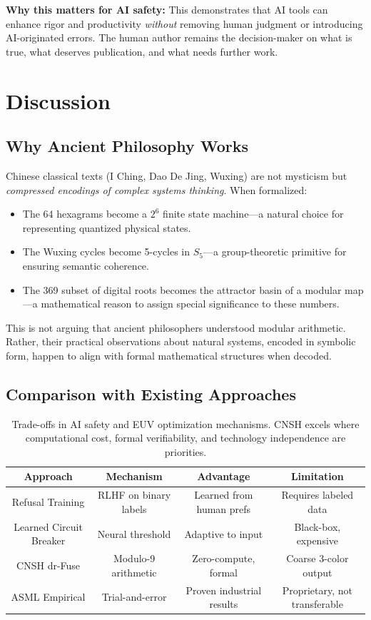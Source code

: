 \documentclass[twocolumn]{article}
\begin{document}
\textbf{Why this matters for AI safety:} This demonstrates that AI tools can enhance rigor and productivity \emph{without} removing human judgment or introducing AI-originated errors. The human author remains the decision-maker on what is true, what deserves publication, and what needs further work.

\section{Discussion}

\subsection{Why Ancient Philosophy Works}

Chinese classical texts (I Ching, Dao De Jing, Wuxing) are not mysticism but \emph{compressed encodings of complex systems thinking}. When formalized:

\begin{itemize}
  \item The 64 hexagrams become a $2^6$ finite state machine—a natural choice for representing quantized physical states.
  \item The Wuxing cycles become 5-cycles in $S_5$—a group-theoretic primitive for ensuring semantic coherence.
  \item The 369 subset of digital roots becomes the attractor basin of a modular map—a mathematical reason to assign special significance to these numbers.
\end{itemize}

This is not arguing that ancient philosophers understood modular arithmetic. Rather, their practical observations about natural systems, encoded in symbolic form, happen to align with formal mathematical structures when decoded.

\subsection{Comparison with Existing Approaches}

\begin{table}[h]
\centering
\begin{tabular}{|c|c|c|c|}
\hline
Approach & Mechanism & Advantage & Limitation \\
\hline
Refusal Training & RLHF on binary labels & Learned from human prefs & Requires labeled data \\
Learned Circuit Breaker & Neural threshold & Adaptive to input & Black-box, expensive \\
CNSH dr-Fuse & Modulo-9 arithmetic & Zero-compute, formal & Coarse 3-color output \\
ASML Empirical & Trial-and-error & Proven industrial results & Proprietary, not transferable \\
\hline
\end{tabular}
\caption{Trade-offs in AI safety and EUV optimization mechanisms. CNSH excels where computational cost, formal verifiability, and technology independence are priorities.}
\end{table}
\end{document}
